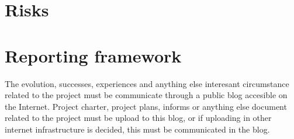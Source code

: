 \documentclass[twocolumn]{article}
\begin{document}
\section{Risks}


\section{Reporting framework}
The evolution, successes, experiences and anything else interesant
circumstance related to the project must be communicate through a
public blog accesible on the Internet. Project charter, project plans,
informs or anything else document related to the project must be
upload to this blog, or if uploading in other internet infrastructure
is decided, this must be communicated in the blog.
\end{document}
